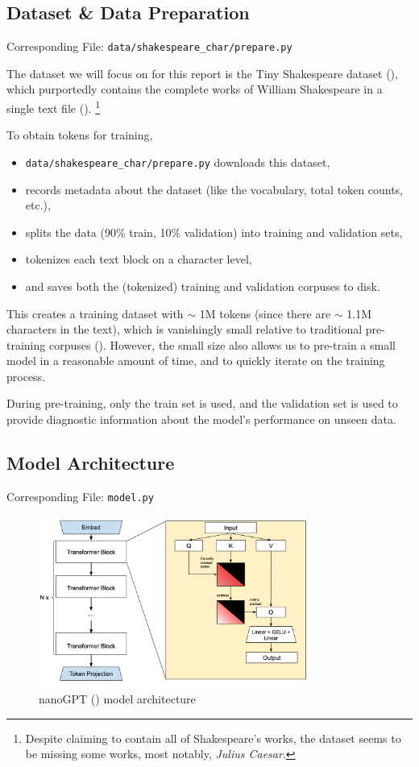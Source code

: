 \documentclass{article} %
\theoremstyle{definition}
\begin{document}
\subsection{Dataset \& Data Preparation}

Corresponding File: \texttt{data/shakespeare\_char/prepare.py}

The dataset we will focus on for this report is the Tiny Shakespeare dataset (\cite{tinyss}),
which purportedly contains the complete works of William Shakespeare in a single text file (\cite{tinyss2}).
\footnote{
    Despite claiming to contain all of Shakespeare's works, the dataset seems to be missing
    some works, most notably, \textit{Julius Caesar}.
}

To obtain tokens for training, 
\begin{itemize}
    \item \texttt{data/shakespeare\_char/prepare.py} downloads this dataset,
    \item records metadata about the dataset (like the vocabulary, total token counts, etc.),
    \item splits the data (90\% train, 10\% validation) into training and validation sets,
    \item tokenizes each text block on a character level,
    \item and saves both the (tokenized) training and validation corpuses to disk.
\end{itemize}

This creates a training dataset with $\sim$ 1M tokens (since there are $\sim$ 1.1M characters in the text),
which is vanishingly small relative to traditional pre-training corpuses (\cite{beh-2025}).
However, the small size also allows us to pre-train a small model in a reasonable amount of time,
and to quickly iterate on the training process.

During pre-training, only the train set is used, and the validation set is used
to provide diagnostic information about the model's performance on unseen data.

\subsection{Model Architecture}
Corresponding File: \texttt{model.py}

\begin{figure}[h]
    \centering
    \includegraphics[width=0.8\textwidth]{images/gpt_arch.png}
    \caption{nanoGPT (\cite{nanoGPT}) model architecture}
    \label{fig:nanogpt_architecture}
\end{figure}
\end{document}
